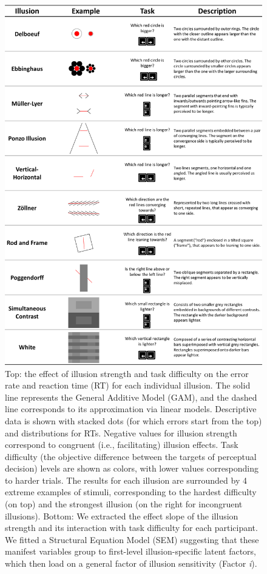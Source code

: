 \documentclass[
  man,floatsintext]{apa6}
\begin{document}
\begin{figure}
\includegraphics[width=1\linewidth]{../figures/Figure2} \caption{Top: the effect of illusion strength and task difficulty on the error rate and reaction time (RT) for each individual illusion. The solid line represents the General Additive Model (GAM), and the dashed line corresponds to its approximation via linear models. Descriptive data is shown with stacked dots (for which errors start from the top) and distributions for RTs. Negative values for illusion strength correspond to congruent (i.e., facilitating) illusion effects. Task difficulty (the objective difference between the targets of perceptual decision) levels are shown as colors, with lower values corresponding to harder trials. The results for each illusion are surrounded by 4 extreme examples of stimuli, corresponding to the hardest difficulty (on top) and the strongest illusion (on the right for incongruent illusions). Bottom: We extracted the effect slope of the illusion strength and its interaction with task difficulty for each participant. We fitted a Structural Equation Model (SEM) suggesting that these manifest variables group to first-level illusion-specific latent factors, which then load on a general factor of illusion sensitivity (Factor \textit{i}).}\label{fig:unnamed-chunk-3}
\end{figure}
\end{document}
